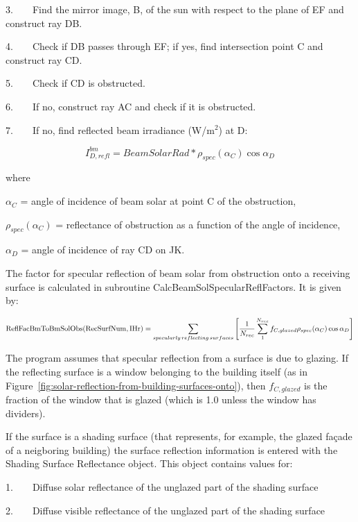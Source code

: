 3.~~~~Find the mirror image, B, of the sun with respect to the plane of EF and construct ray DB.

4.~~~~Check if DB passes through EF; if yes, find intersection point C and construct ray CD.

5.~~~~Check if CD is obstructed.

6.~~~~If no, construct ray AC and check if it is obstructed.

7.~~~~If no, find reflected beam irradiance (W/m\(^{2}\)) at D:

\begin{equation}
I_{D,refl}^{bm} = BeamSolarRad*{\rho_{spec}}({\alpha_C})\cos {\alpha_D}
\end{equation}

where

\({\alpha_C}\) = angle of incidence of beam solar at point C of the obstruction,

\({\rho_{spec}}({\alpha_C})\) = reflectance of obstruction as a function of the angle of incidence,

\({\alpha_D}\) = angle of incidence of ray CD on JK.

The factor for specular reflection of beam solar from obstruction onto a receiving surface is calculated in subroutine CalcBeamSolSpecularReflFactors. It is given by:

\begin{equation}
{\rm{ReflFacBmToBmSolObs(RecSurfNum,IHr) }} = \sum\limits_{\scriptstyle \substack{specularly \, reflecting \, surfaces}} \left[ {\frac{1}{{{N_{rec}}}}\sum\limits_1^{{N_{rec}}} {{f_{C,glazed}}{\rho_{spec}}({\alpha_C})\cos {\alpha_D}} } \right]
\end{equation}

The program assumes that specular reflection from a surface is due to glazing. If the reflecting surface is a window belonging to the building itself (as in Figure~\ref{fig:solar-reflection-from-building-surfaces-onto}), then \({f_{C,glazed}}\) is the fraction of the window that is glazed (which is 1.0 unless the window has dividers).

If the surface is a shading surface (that represents, for example, the glazed façade of a neigboring building) the surface reflection information is entered with the Shading Surface Reflectance object. This object contains values for:

1.~~~~Diffuse solar reflectance of the unglazed part of the shading surface

2.~~~~Diffuse visible reflectance of the unglazed part of the shading surface

